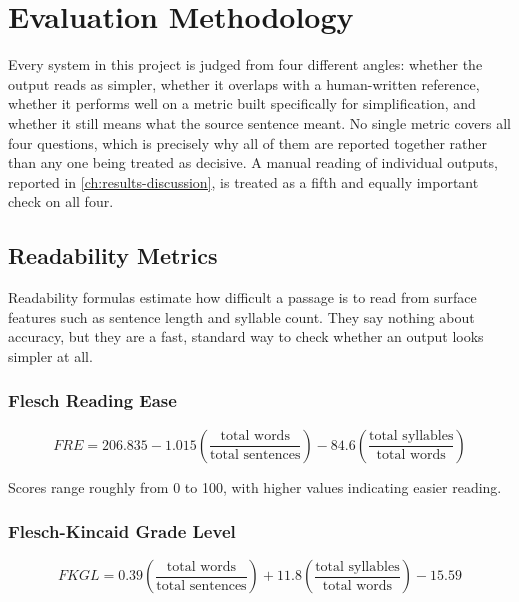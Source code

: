 \chapter{Evaluation Methodology}
\label{ch:evaluation-methodology}

Every system in this project is judged from four different angles: whether the output reads as simpler, whether it overlaps with a human-written reference, whether it performs well on a metric built specifically for simplification, and whether it still means what the source sentence meant. No single metric covers all four questions, which is precisely why all of them are reported together rather than any one being treated as decisive. A manual reading of individual outputs, reported in \cref{ch:results-discussion}, is treated as a fifth and equally important check on all four.

\section{Readability Metrics}
\label{sec:readability-metrics}

Readability formulas estimate how difficult a passage is to read from surface features such as sentence length and syllable count. They say nothing about accuracy, but they are a fast, standard way to check whether an output looks simpler at all.

\subsection*{Flesch Reading Ease}

\begin{equation}
    \label{eq:flesch-reading-ease}
    FRE = 206.835 - 1.015 \left( \frac{\text{total words}}{\text{total sentences}} \right) - 84.6 \left( \frac{\text{total syllables}}{\text{total words}} \right)
\end{equation}

Scores range roughly from 0 to 100, with higher values indicating easier reading.

\subsection*{Flesch-Kincaid Grade Level}

\begin{equation}
    \label{eq:flesch-kincaid}
    FKGL = 0.39 \left( \frac{\text{total words}}{\text{total sentences}} \right) + 11.8 \left( \frac{\text{total syllables}}{\text{total words}} \right) - 15.59
\end{equation}


